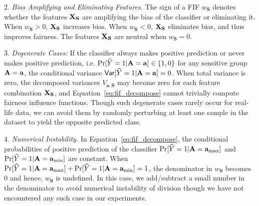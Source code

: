 2. \textit{Bias Amplifying and Eliminating Features.} The sign of a FIF $ w_{\mathbf{S}} $ denotes whether the features $ \mathbf{X}_{\mathbf{S}} $ are amplifying the bias of the classifier or eliminating it. When $ w_{\mathbf{S}} > 0 $, $ \mathbf{X}_{\mathbf{S}} $ increases bias. When $ w_{\mathbf{S}} < 0 $, $ \mathbf{X}_{\mathbf{S}} $ eliminates bias, and thus improves fairness. The features $ \mathbf{X}_{\mathbf{S}} $ are neutral when $ w_{\mathbf{S}} = 0 $.

3. \textit{Degenerate Cases:} If the classifier always makes positive prediction or never makes positive prediction, i.e. $ \Pr[\widehat{Y} = 1 | \mathbf{A} = \mathbf{a}] \in \{1, 0\} $ for any sensitive group $ \mathbf{A} = \mathbf{a} $, the conditional variance $ \mathsf{Var}[\widehat{Y} = 1 | \mathbf{A} = \mathbf{a}]  = 0 $. When total variance is zero, the decomposed variances $V_{\mathbf{a},\mathbf{S}}$ may become zero for each feature combination $\mathbf{X}_\mathbf{S}$, and Equation~\eqref{eq:fif_decompose} cannot trivially compute fairness influence functions. Though such degenerate cases rarely occur for real-life data, we can avoid them by randomly perturbing at least one sample in the dataset to yield the opposite predicted class.

4. \textit{Numerical Instability.} In Equation~\eqref{eq:fif_decompose}, the conditional probabilities of positive prediction of the classifier $ \Pr[\widehat{Y} = 1 | \mathbf{A} = \mathbf{a}_{\max}]  $ and $ \Pr[\widehat{Y} = 1 | \mathbf{A} = \mathbf{a}_{\min}]  $ are constant. When $ \Pr[\widehat{Y} = 1 | \mathbf{A} = \mathbf{a}_{\max}] + \Pr[\widehat{Y} = 1 | \mathbf{A} = \mathbf{a}_{\min}]   = 1 $, the denominator in $ w_{\mathbf{S}} $ becomes $ 0 $ and hence, $ w_{\mathbf{S}} $ is undefined. In this case, we add/subtract a small number in the denominator to avoid numerical instability of division though we have not encountered any such case in our experiments.%




